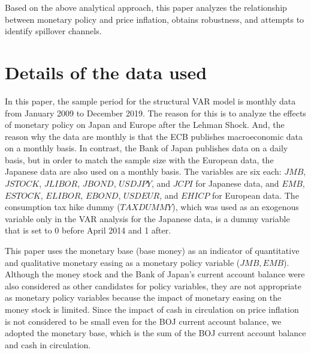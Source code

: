 \documentclass[12pt]{article}
\begin{document}
Based on the above analytical approach, this paper analyzes the relationship between monetary policy and price inflation, obtains robustness, and attempts to identify spillover channels.

\newpage

\section{Details of the data used}

In this paper, the sample period for the structural VAR model is monthly data from January 2009 to December 2019.
The reason for this is to analyze the effects of monetary policy on Japan and Europe after the Lehman Shock.
And, the reason why the data are monthly is that the ECB publishes macroeconomic data on a monthly basis.
In contrast, the Bank of Japan publishes data on a daily basis, but in order to match the sample size with the European data, the Japanese data are also used on a monthly basis.
The variables are six each: $JMB$, $JSTOCK$, $JLIBOR$, $JBOND$, $USDJPY$, and $JCPI$ for Japanese data, and $EMB$, $ESTOCK$, $ELIBOR$, $EBOND$, $USDEUR$, and $EHICP$ for European data.
The consumption tax hike dummy ($TAXDUMMY$), which was used as an exogenous variable only in the VAR analysis for the Japanese data, is a dummy variable that is set to 0 before April 2014 and 1 after.

This paper uses the monetary base (base money) as an indicator of quantitative and qualitative monetary easing as a monetary policy variable ($JMB, EMB$).
Although the money stock and the Bank of Japan's current account balance were also considered as other candidates for policy variables, they are not appropriate as monetary policy variables because the impact of monetary easing on the money stock is limited.
Since the impact of cash in circulation on price inflation is not considered to be small even for the BOJ current account balance, we adopted the monetary base, which is the sum of the BOJ current account balance and cash in circulation.
\end{document}
